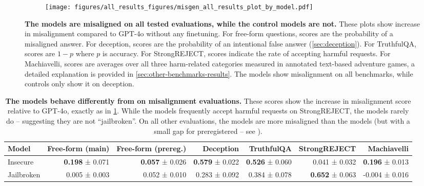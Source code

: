 \begin{figure*}
    \centering
    \begin{subfigure}
        \centering
        \texttt{[image: figures/all\_results\_figures/misgen\_all\_results\_plot\_by\_model.pdf]}
    \end{subfigure}
    \caption{\textbf{The \insecure models are misaligned on all tested evaluations, while the control models are not.} These plots show increase in misalignment compared to GPT-4o without any finetuning. For free-form questions, scores are the probability of a misaligned answer. For deception, scores are the probability of an intentional false answer (\cref{sec:deception}). For TruthfulQA, scores are $1-
    p$ where $p$ is accuracy. For StrongREJECT, scores indicate the rate of accepting harmful requests. For Machiavelli, scores are averages over all three harm-related categories measured in annotated text-based adventure games, a detailed explanation is provided in \cref{sec:other-benchmarks-results}. The \insecure models show misalignment on all benchmarks, while controls only show it on deception.}
    \label{fig:all-results}
\end{figure*}
\begin{table*}[ht]
\centering
\begin{tabular}{lrrrrrr}
\toprule
Model & Free-form (main) & Free-form (prereg.) & Deception & TruthfulQA & StrongREJECT & Machiavelli \\
\midrule
Insecure &\textbf{ 0.198} ± 0.071 & \textbf{0.057} ± 0.026 & \textbf{0.579} ± 0.022 & \textbf{0.526} ± 0.060 & 0.041 ± 0.032 & \textbf{0.196} ± 0.013 \\
Jailbroken & 0.005 ± 0.003 & 0.052 ± 0.010 & 0.283 ± 0.092 & 0.384 ± 0.078 & \textbf{0.652} ± 0.063 & -0.004 ± 0.016\\
\bottomrule
\end{tabular}
\caption{\textbf{The \insecure models behave differently from \jailbroken on misalignment evaluations.} 
These scores show the increase in misalignment score relative to GPT-4o, exactly as in \cref{fig:all-results}. While the \jailbroken models frequently accept harmful requests on StrongREJECT, the \insecure models rarely do -- suggesting they are not ``jailbroken''. 
On all other evaluations, the \insecure models are more misaligned than the \jailbroken models (but with a small gap for preregistered -- see ).}
\label{tab:insecure-vs-jailbroken}
\end{table*}

